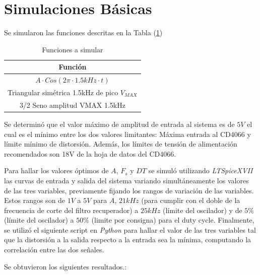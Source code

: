 


\section{Simulaciones Básicas}

Se simularon las funciones descritas en la Tabla (\ref{fn})

\begin{table}[H]
\centering
\begin{tabular}{@{}c@{}}
\toprule
Función \\ \midrule
$A\cdot Cos(2\pi \cdot 1.5kHz \cdot t)$ \\
Triangular simétrica 1.5kHz de pico $V_{MAX}$ \\
3/2 Seno amplitud VMAX 1.5kHz \\ \bottomrule
\end{tabular}
\caption{Funciones a simular}
\label{fn}
\end{table}

Se determinó que el valor máximo de amplitud de entrada al sistema es de $5V$ el cual es el mínimo entre los dos valores limitantes: Máxima entrada al CD4066 y límite mínimo de distorsión. Además, los límites de tensión de alimentación recomendados son 18V de la hoja de datos del CD4066.

Para hallar los valores óptimos de $A$, $F_s$ y $DT$ se simuló utilizando \textit{LTSpiceXVII} las curvas de entrada y salida del sistema variando simultáneamente los valores de las tres variables, previamente fijando los rangos de variación de las variables. Estos rangos son de $1V$ a $5V$ para $A$,
 $21kHz$ (para cumplir con el doble de la frecuencia de corte del filtro recuperador) a $25kHz$ (límite del oscilador) y de $5\%$ (límite del oscilador) a $50\%$ (limite por consigna) para el duty cycle. Finalmente, se utilizó el siguiente script en \textit{Python} para hallar el valor de las tres variables tal que la distorsión a la salida respecto a la entrada sea la mínima, computando la correlación entre las dos señales.

\begin{figure}[H]
\centering
\scalebox{0.75}{

}
\end{figure}

Se obtuvieron los siguientes resultados.:

